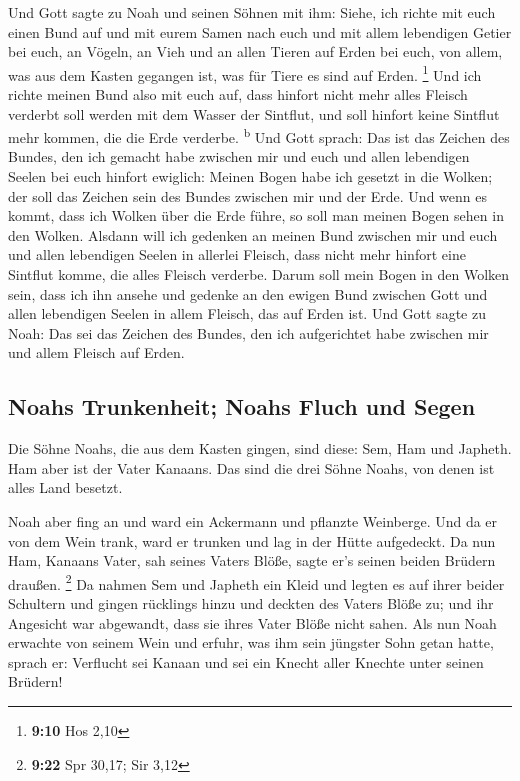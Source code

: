  Und Gott sagte zu Noah und seinen Söhnen mit ihm:
 Siehe, ich richte mit euch einen Bund auf und mit eurem
Samen nach euch  und mit allem lebendigen Getier bei
euch, an Vögeln, an Vieh und an allen Tieren auf Erden bei euch, von
allem, was aus dem Kasten gegangen ist, was für Tiere es sind auf Erden.
\footnote{\textbf{9:10} Hos 2,10}  Und ich richte meinen
Bund also mit euch auf, dass hinfort nicht mehr alles Fleisch verderbt
soll werden mit dem Wasser der Sintflut, und soll hinfort keine Sintflut
mehr kommen, die die Erde verderbe. \textsuperscript{b} 
Und Gott sprach: Das ist das Zeichen des Bundes, den ich gemacht habe
zwischen mir und euch und allen lebendigen Seelen bei euch hinfort
ewiglich:  Meinen Bogen habe ich gesetzt in die Wolken;
der soll das Zeichen sein des Bundes zwischen mir und der Erde.
 Und wenn es kommt, dass ich Wolken über die Erde führe,
so soll man meinen Bogen sehen in den Wolken.  Alsdann
will ich gedenken an meinen Bund zwischen mir und euch und allen
lebendigen Seelen in allerlei Fleisch, dass nicht mehr hinfort eine
Sintflut komme, die alles Fleisch verderbe.  Darum soll
mein Bogen in den Wolken sein, dass ich ihn ansehe und gedenke an den
ewigen Bund zwischen Gott und allen lebendigen Seelen in allem Fleisch,
das auf Erden ist.  Und Gott sagte zu Noah: Das sei das
Zeichen des Bundes, den ich aufgerichtet habe zwischen mir und allem
Fleisch auf Erden.

\hypertarget{noahs-trunkenheit-noahs-fluch-und-segen}{%
\subsection{Noahs Trunkenheit; Noahs Fluch und
Segen}\label{noahs-trunkenheit-noahs-fluch-und-segen}}

 Die Söhne Noahs, die aus dem Kasten gingen, sind diese:
Sem, Ham und Japheth. Ham aber ist der Vater Kanaans. 
Das sind die drei Söhne Noahs, von denen ist alles Land besetzt.

 Noah aber fing an und ward ein Ackermann und pflanzte
Weinberge.  Und da er von dem Wein trank, ward er trunken
und lag in der Hütte aufgedeckt.  Da nun Ham, Kanaans
Vater, sah seines Vaters Blöße, sagte er's seinen beiden Brüdern
draußen. \footnote{\textbf{9:22} Spr 30,17; Sir 3,12}  Da
nahmen Sem und Japheth ein Kleid und legten es auf ihrer beider
Schultern und gingen rücklings hinzu und deckten des Vaters Blöße zu;
und ihr Angesicht war abgewandt, dass sie ihres Vater Blöße nicht sahen.
 Als nun Noah erwachte von seinem Wein und erfuhr, was
ihm sein jüngster Sohn getan hatte,  sprach er: Verflucht
sei Kanaan und sei ein Knecht aller Knechte unter seinen Brüdern!


